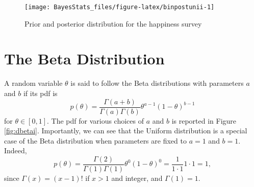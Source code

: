 \documentclass[
]{book}
\begin{document}
\begin{figure}

{\centering \texttt{[image: BayesStats\_files/figure-latex/binpostunii-1]} 

}

\caption{Prior and posterior distribution for the happiness survey}\label{fig:binpostunii}
\end{figure}

\hypertarget{the-beta-distribution}{%
\section{The Beta Distribution}\label{the-beta-distribution}}

A random variable \(\theta\) is said to follow the Beta distributions with parameters \(a\) and \(b\) if its pdf is
\[
p(\theta)=\frac{\Gamma(a+b)}{\Gamma(a)\Gamma(b)}\theta^{a-1}(1-\theta)^{b-1}
\]
for \(\theta\in[0,1]\). The pdf for various choices of \(a\) and \(b\) is reported in Figure \ref{fig:dbetai}. Importantly, we can see that the Uniform distribution is a special case of the Beta distribution when parameters are fixed to \(a=1\) and \(b=1\). Indeed,
\[
p(\theta)=\frac{\Gamma(2)}{\Gamma(1)\Gamma(1)}\theta^{0}(1-\theta)^{0}=\frac{1}{1\cdot 1} 1\cdot 1 = 1,
\]
since \(\Gamma(x)=(x-1)!\) if \(x>1\) and integer, and \(\Gamma(1)=1\).
\end{document}
